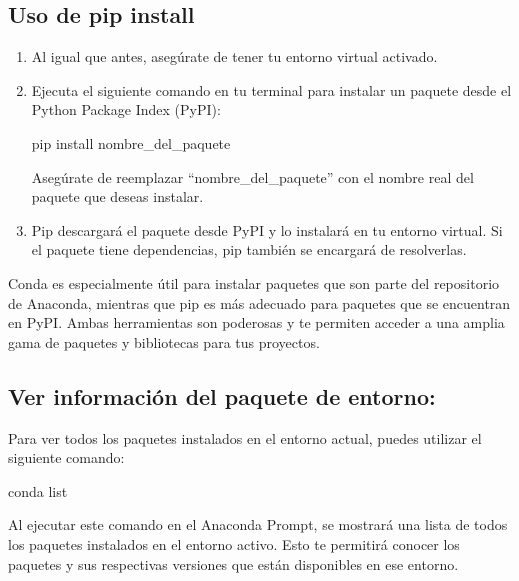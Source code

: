 \documentclass[
  jou,
  floatsintext,
  longtable,
  a4paper,
  nolmodern,
  notxfonts,
  notimes,
  colorlinks=true,linkcolor=blue,citecolor=blue,urlcolor=blue]{apa7}
\newenvironment{Shaded}{\begin{snugshade}}{\end{snugshade}}
\newcommand{\ExtensionTok}[1]{\textcolor[rgb]{0.00,0.23,0.31}{#1}}
\newcommand{\NormalTok}[1]{\textcolor[rgb]{0.00,0.23,0.31}{#1}}
\begin{document}
\subsection{Uso de pip install}\label{uso-de-pip-install}

\begin{enumerate}
\def\labelenumi{\arabic{enumi}.}
\item
  Al igual que antes, asegúrate de tener tu entorno virtual activado.
\item
  Ejecuta el siguiente comando en tu terminal para instalar un paquete
  desde el Python Package Index (PyPI):

\begin{Shaded}
\begin{Highlighting}[]
\ExtensionTok{pip}\NormalTok{ install nombre\_del\_paquete}
\end{Highlighting}
\end{Shaded}

  Asegúrate de reemplazar ``nombre\_del\_paquete'' con el nombre real
  del paquete que deseas instalar.
\item
  Pip descargará el paquete desde PyPI y lo instalará en tu entorno
  virtual. Si el paquete tiene dependencias, pip también se encargará de
  resolverlas.
\end{enumerate}

Conda es especialmente útil para instalar paquetes que son parte del
repositorio de Anaconda, mientras que pip es más adecuado para paquetes
que se encuentran en PyPI. Ambas herramientas son poderosas y te
permiten acceder a una amplia gama de paquetes y bibliotecas para tus
proyectos.

\subsection{Ver información del paquete de
entorno:}\label{ver-informaciuxf3n-del-paquete-de-entorno}

Para ver todos los paquetes instalados en el entorno actual, puedes
utilizar el siguiente comando:

\begin{Shaded}
\begin{Highlighting}[]
\ExtensionTok{conda}\NormalTok{ list}
\end{Highlighting}
\end{Shaded}

Al ejecutar este comando en el Anaconda Prompt, se mostrará una lista de
todos los paquetes instalados en el entorno activo. Esto te permitirá
conocer los paquetes y sus respectivas versiones que están disponibles
en ese entorno.
\end{document}
